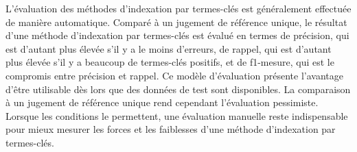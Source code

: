     L'évaluation des méthodes d'indexation par termes-clés est généralement
    effectuée de manière automatique. Comparé à un jugement de référence unique,
    le résultat d'une méthode d'indexation par termes-clés est évalué en termes
    de précision, qui est d'autant plus élevée s'il y a le moins d'erreurs, de
    rappel, qui est d'autant plus élevée s'il y a beaucoup de termes-clés
    positifs, et de f1-mesure, qui est le compromis entre précision et rappel.
    Ce modèle d'évaluation présente l'avantage d'être utilisable dès lors que
    des données de test sont disponibles. La comparaison à un jugement de
    référence unique rend cependant l'évaluation pessimiste. Lorsque les
    conditions le permettent, une évaluation manuelle reste indispensable pour
    mieux mesurer les forces et les faiblesses d'une méthode d'indexation par
    termes-clés.

